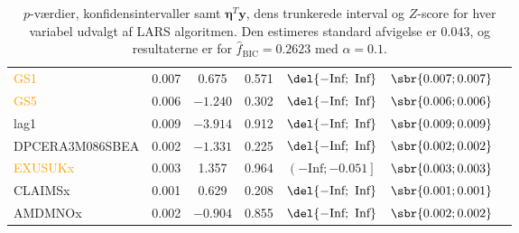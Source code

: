 \begin{table}[ht]
{\begin{tabular}{lcccccc}
 \textcolor{orange}{GS1} &  0.007&   0.675  & 0.571 &      $\del{-\text{Inf}   ;  \text{ Inf} }$ &   $\sbr{0.007 ;  0.007}$     \\
 \textcolor{orange}{GS5} &   0.006 &$ -1.240$  & 0.302&      $\del{-\text{Inf}   ;  \text{ Inf} }$&   $\sbr{0.006;  0.006}$   \\
 \textcolor{blue3}{lag1} & 0.009& $ -3.914  $  &  0.912   &  $\del{-\text{Inf}   ;  \text{ Inf} }$& $\sbr{0.009;   0.009 }$   \\
  \textcolor{red3}{DPCERA3M086SBEA}   & 0.002&  $-1.331  $ & 0.225 &      $\del{-\text{Inf}   ;  \text{ Inf} }$& $\sbr{0.002;   0.002 }$   \\
 \textcolor{orange}{EXUSUKx} & 0.003 &  1.357   & 0.964  &    $\left( -\text{Inf}   ;  -0.051\right] $&  $\sbr{0.003 ;  0.003}$   \\
 \textcolor{blue3}{CLAIMSx} &  0.001  & 0.629  & 0.208   &   $\del{-\text{Inf}   ;  \text{ Inf} }$ & $\sbr{ 0.001 ;  0.001 }$  \\
 \textcolor{red3}{AMDMNOx} &  0.002&  $-0.904 $   & 0.855     &  $\del{-\text{Inf}   ;  \text{ Inf} }$&$\sbr{0.002 ;  0.002}$  \\ \bottomrule
\end{tabular}  
}
\caption{\(p\)-værdier, konfidensintervaller samt  $\boldsymbol{\eta}^T\textbf{y}$, dens trunkerede interval og $Z$-score for hver variabel udvalgt af LARS algoritmen. Den estimeres standard afvigelse er \(0.043\), og resultaterne er for \(\widehat{f}_{\text{BIC}} = 0.2623 \) med \(\alpha = 0.1\).} \label{tab:larInf_bic}
\end{table} 